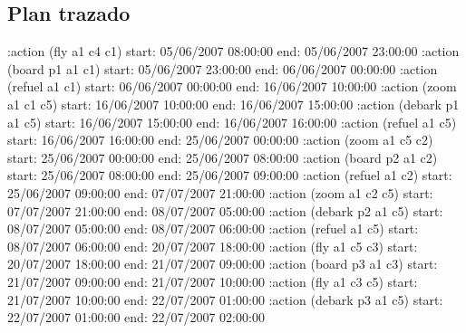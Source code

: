 \documentclass[	DIV=calc,%
							paper=a4,%
							fontsize=11pt]{scrartcl}	 					%
\begin{document}
\subsection{Plan trazado}
\label{sub:Plan trazado}

\begin{bashcode}
	:action (fly a1 c4 c1) start: 05/06/2007 08:00:00 end: 05/06/2007 23:00:00
	:action (board p1 a1 c1) start: 05/06/2007 23:00:00 end: 06/06/2007 00:00:00
	:action (refuel a1 c1) start: 06/06/2007 00:00:00 end: 16/06/2007 10:00:00
	:action (zoom a1 c1 c5) start: 16/06/2007 10:00:00 end: 16/06/2007 15:00:00
	:action (debark p1 a1 c5) start: 16/06/2007 15:00:00 end: 16/06/2007 16:00:00
	:action (refuel a1 c5) start: 16/06/2007 16:00:00 end: 25/06/2007 00:00:00
	:action (zoom a1 c5 c2) start: 25/06/2007 00:00:00 end: 25/06/2007 08:00:00
	:action (board p2 a1 c2) start: 25/06/2007 08:00:00 end: 25/06/2007 09:00:00
	:action (refuel a1 c2) start: 25/06/2007 09:00:00 end: 07/07/2007 21:00:00
	:action (zoom a1 c2 c5) start: 07/07/2007 21:00:00 end: 08/07/2007 05:00:00
	:action (debark p2 a1 c5) start: 08/07/2007 05:00:00 end: 08/07/2007 06:00:00
	:action (refuel a1 c5) start: 08/07/2007 06:00:00 end: 20/07/2007 18:00:00
	:action (fly a1 c5 c3) start: 20/07/2007 18:00:00 end: 21/07/2007 09:00:00
	:action (board p3 a1 c3) start: 21/07/2007 09:00:00 end: 21/07/2007 10:00:00
	:action (fly a1 c3 c5) start: 21/07/2007 10:00:00 end: 22/07/2007 01:00:00
	:action (debark p3 a1 c5) start: 22/07/2007 01:00:00 end: 22/07/2007 02:00:00
\end{bashcode}
\end{document}
